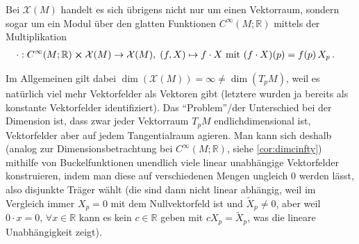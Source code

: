 \documentclass[../H_Analysis_main.tex]{subfiles}
\begin{document}

Bei $\mathcal{X}(M)$ handelt es sich übrigens nicht nur um einen Vektorraum, sondern sogar um ein Modul über den glatten Funktionen $C^\infty(M; \mathbb{R})$ mittels der Multiplikation
\begin{equation}
\begin{split}
\cdot&: C^\infty(M; \mathbb{R}) \cross \mathcal{X}(M) \rightarrow \mathcal{X}(M), \; (f, X) \mapsto f \cdot X \text{ mit } (f \cdot X)(p) = f(p) \, X_p \, .
\end{split}
\end{equation}

Im Allgemeinen gilt dabei $\dim(\mathcal{X}(M)) = \infty \neq \dim(T_p M)$, weil es natürlich viel mehr Vektorfelder als Vektoren gibt (letztere wurden ja bereits als konstante Vektorfelder identifiziert). Das \enquote{Problem}/der Unterschied bei der Dimension ist, dass zwar jeder Vektorraum $T_p M$ endlichdimensional ist, Vektorfelder aber auf jedem Tangentialraum agieren. Man kann sich deshalb (analog zur Dimensionsbetrachtung bei $C^\infty(M; \mathbb{R})$, siehe \ref{cor:dimcinfty}) mithilfe von Buckelfunktionen unendlich viele linear unabhängige Vektorfelder konstruieren, indem man diese auf verschiedenen Mengen ungleich 0 werden lässt, also disjunkte Träger wählt (die sind dann nicht linear abhängig, weil im Vergleich immer $X_p = 0$ mit dem Nullvektorfeld ist und $\tilde{X}_p \neq 0$, aber weil $0 \cdot x = 0, \, \forall x \in \mathbb{R}$ kann es kein $c \in \mathbb{R}$ geben mit $c X_p = \tilde{X}_p$, was die lineare Unabhängigkeit zeigt).

\end{document}
